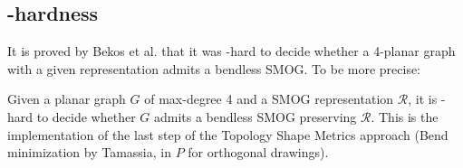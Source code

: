 \subsection{\NP-hardness}
It is proved by Bekos et al. that it was \NP-hard to decide whether a 4-planar graph with a given representation admits a bendless SMOG. To be more precise:
\begin{theorem}
	Given a planar graph $G$ of max-degree 4 and a SMOG representation $\mathcal{R}$, it is \NP-hard to decide whether $G$ admits a bendless SMOG preserving $\mathcal{R}$. This is the implementation of the last step of the Topology Shape Metrics approach (Bend minimization by Tamassia, in $P$ for orthogonal drawings). %
	\label{th:NP-hard-4}
\end{theorem}
